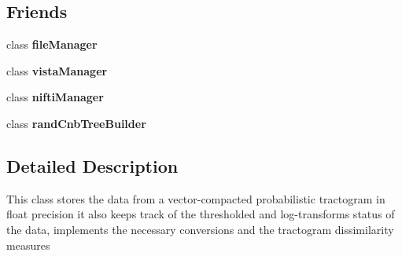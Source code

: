 \subsection*{\-Friends}
\begin{DoxyCompactItemize}
\item 
\hypertarget{classcompactTract_a7ea7d52c87a9299a8dad891be045a681}{class {\bfseries file\-Manager}}\label{classcompactTract_a7ea7d52c87a9299a8dad891be045a681}

\item 
\hypertarget{classcompactTract_a9314384ea65b036521db3749c607fac4}{class {\bfseries vista\-Manager}}\label{classcompactTract_a9314384ea65b036521db3749c607fac4}

\item 
\hypertarget{classcompactTract_abdbb08f5306829a91e8cbf995fa8a06d}{class {\bfseries nifti\-Manager}}\label{classcompactTract_abdbb08f5306829a91e8cbf995fa8a06d}

\item 
\hypertarget{classcompactTract_aa166ce0e9265255d37c059e22933ad75}{class {\bfseries rand\-Cnb\-Tree\-Builder}}\label{classcompactTract_aa166ce0e9265255d37c059e22933ad75}

\end{DoxyCompactItemize}


\subsection{\-Detailed \-Description}
\-This class stores the data from a vector-\/compacted probabilistic tractogram in float precision it also keeps track of the thresholded and log-\/transforms status of the data, implements the necessary conversions and the tractogram dissimilarity measures 


